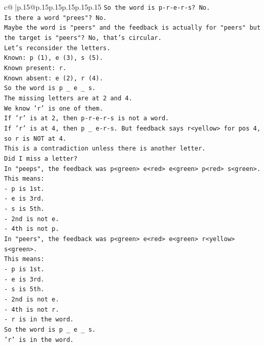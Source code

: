 \documentclass{article}
\begin{document}
{\begin{supertabular}{c@{$\;$}|p{.15\linewidth}@{}p{.15\linewidth}p{.15\linewidth}p{.15\linewidth}p{.15\linewidth}p{.15\linewidth}}
{{{\texttt{So the word is p{-}r{-}e{-}r{-}s? No.} \\
\texttt{Is there a word "prees"? No.} \\
\texttt{Maybe the word is "peers" and the feedback is actually for "peers" but the target is "peers"? No, that's circular.} \\
\texttt{Let's reconsider the letters.} \\
\texttt{Known: p (1), e (3), s (5).} \\
\texttt{Known present: r.} \\
\texttt{Known absent: e (2), r (4).} \\
\texttt{So the word is p \_ e \_ s.} \\
\texttt{The missing letters are at 2 and 4.} \\
\texttt{We know 'r' is one of them.} \\
\texttt{If 'r' is at 2, then p{-}r{-}e{-}r{-}s is not a word.} \\
\texttt{If 'r' is at 4, then p \_ e{-}r{-}s. But feedback says r<yellow> for pos 4, so r is NOT at 4.} \\
\texttt{This is a contradiction unless there is another letter.} \\
\texttt{Did I miss a letter?} \\
\texttt{In "peeps", the feedback was p<green> e<red> e<green> p<red> s<green>.} \\
\texttt{This means:} \\
\texttt{{-} p is 1st.} \\
\texttt{{-} e is 3rd.} \\
\texttt{{-} s is 5th.} \\
\texttt{{-} 2nd is not e.} \\
\texttt{{-} 4th is not p.} \\
\texttt{In "peers", the feedback was p<green> e<red> e<green> r<yellow> s<green>.} \\
\texttt{This means:} \\
\texttt{{-} p is 1st.} \\
\texttt{{-} e is 3rd.} \\
\texttt{{-} s is 5th.} \\
\texttt{{-} 2nd is not e.} \\
\texttt{{-} 4th is not r.} \\
\texttt{{-} r is in the word.} \\
\texttt{So the word is p \_ e \_ s.} \\
\texttt{'r' is in the word.} \\
}}}
\end{supertabular}}
\end{document}
